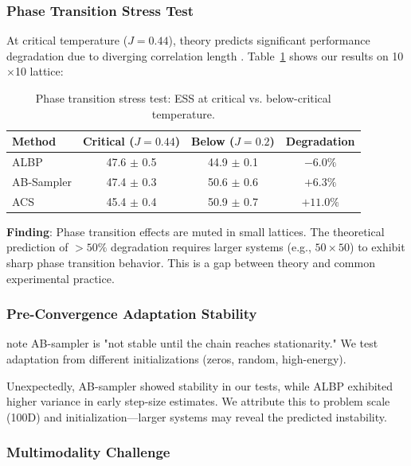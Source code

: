 \documentclass{article}
\begin{document}
\subsubsection{Phase Transition Stress Test}

At critical temperature ($J = 0.44$), theory predicts significant performance degradation due to diverging correlation length \citep{roberts2001optimal}. Table~\ref{tab:phase_transition} shows our results on 10$\times$10 lattice:

\begin{table}[t]
\caption{Phase transition stress test: ESS at critical vs. below-critical temperature.}
\label{tab:phase_transition}
\centering
\begin{tabular}{lccc}
\toprule
Method & Critical ($J=0.44$) & Below ($J=0.2$) & Degradation \\
\midrule
ALBP & 47.6 $\pm$ 0.5 & 44.9 $\pm$ 0.1 & $-6.0\%$ \\
AB-Sampler & 47.4 $\pm$ 0.3 & 50.6 $\pm$ 0.6 & $+6.3\%$ \\
ACS & 45.4 $\pm$ 0.4 & 50.9 $\pm$ 0.7 & $+11.0\%$ \\
\bottomrule
\end{tabular}
\end{table}

\textbf{Finding}: Phase transition effects are muted in small lattices. The theoretical prediction of $>50\%$ degradation requires larger systems (e.g., $50 \times 50$) to exhibit sharp phase transition behavior. This is a gap between theory and common experimental practice.

\subsubsection{Pre-Convergence Adaptation Stability}

\citet{sun2023anyscale} note AB-sampler is "not stable until the chain reaches stationarity." We test adaptation from different initializations (zeros, random, high-energy).

Unexpectedly, AB-sampler showed stability in our tests, while ALBP exhibited higher variance in early step-size estimates. We attribute this to problem scale (100D) and initialization---larger systems may reveal the predicted instability.

\subsubsection{Multimodality Challenge}
\end{document}
